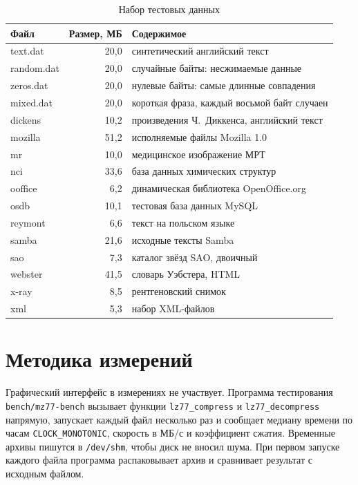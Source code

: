 \begin{table}[H]
\caption{Набор тестовых данных}
\label{tab:corpus}
\begin{tabletext}
\centering
\begin{tabular}{|l|r|l|}
\hline
\textbf{Файл} & \textbf{Размер, МБ} & \textbf{Содержимое} \\
\hline
text.dat & 20,0 & синтетический английский текст \\
random.dat & 20,0 & случайные байты: несжимаемые данные \\
zeros.dat & 20,0 & нулевые байты: самые длинные совпадения \\
mixed.dat & 20,0 & короткая фраза, каждый восьмой байт случаен \\
\hline
dickens & 10,2 & произведения Ч.~Диккенса, английский текст \\
mozilla & 51,2 & исполняемые файлы Mozilla 1.0 \\
mr & 10,0 & медицинское изображение МРТ \\
nci & 33,6 & база данных химических структур \\
ooffice & 6,2 & динамическая библиотека OpenOffice.org \\
osdb & 10,1 & тестовая база данных MySQL \\
reymont & 6,6 & текст на польском языке \\
samba & 21,6 & исходные тексты Samba \\
sao & 7,3 & каталог звёзд SAO, двоичный \\
webster & 41,5 & словарь Уэбстера, HTML \\
x-ray & 8,5 & рентгеновский снимок \\
xml & 5,3 & набор XML-файлов \\
\hline
\end{tabular}
\end{tabletext}
\end{table}

\section{Методика измерений}

Графический интерфейс в измерениях не участвует. Программа тестирования
\texttt{bench/mz77-bench} вызывает функции \texttt{lz77\_compress} и
\texttt{lz77\_decompress} напрямую, запускает каждый файл несколько раз и
сообщает медиану времени по часам \texttt{CLOCK\_MONOTONIC}, скорость в
МБ/с и коэффициент сжатия. Временные архивы пишутся в \texttt{/dev/shm},
чтобы диск не вносил шума. При первом запуске каждого файла программа
распаковывает архив и сравнивает результат с исходным файлом.

